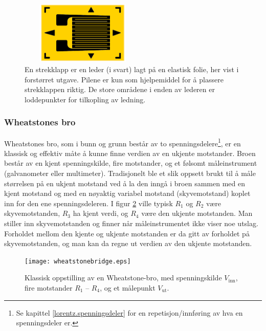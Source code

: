 \documentclass[../Elmag-labhefte-2020.tex]{subfiles}
\begin{document}
\begin{figure}[h!b]
    \centering
    \includegraphics[width=6.01cm,height=3cm,keepaspectratio]{fig/strekklapp.png}
    \caption{%
        En strekklapp er en leder (i svart) lagt på en elastisk folie, her vist i forstørret utgave. Pilene er kun som hjelpemiddel for å plassere strekklappen riktig. De store områdene i enden av lederen er loddepunkter for tilkopling av ledning.
    }   
    \label{fig:strekklapp}
\end{figure}


\subsubsection{Wheatstones bro}\vspace{-5mm}
Wheatstones bro, som i bunn og grunn består av to spenningsdelere\footnote{Se kapittel \ref{lorentz.spenningsdeler} for en repetisjon/innføring av hva en spenningsdeler er.}, er en klassisk og effektiv måte å kunne finne verdien av en ukjente motstander. Broen består av en kjent spenningskilde, fire motstander, og et følsomt måleinstrument (galvanometer eller multimeter). Tradisjonelt ble et slik oppsett brukt til å måle størrelsen på en ukjent motstand ved å la den inngå i broen sammen med en kjent motstand og med en nøyaktig variabel motstand (skyvemotstand) koplet inn for den ene spenningsdeleren. 
I figur \ref{fig:wheatstonebridge} ville typisk $R_1$ og $R_2$ være skyvemotstanden, $R_3$ ha kjent verdi, og $R_4$ være den ukjente motstanden. Man stiller inn skyvemotstanden og finner når måleinstrumentet ikke viser noe utslag.  Forholdet mellom den kjente og ukjente motstanden er da gitt av forholdet på skyvemotstanden, og man kan da regne ut verdien av den ukjente motstanden. 


\begin{figure}[htbp]
    \centering
    \texttt{[image: wheatstonebridge.eps]}
    \caption{%
        Klassisk oppstilling av en Wheatstone-bro, med spenningskilde $V_\text{inn}$, fire motstander $R_1$ -- $R_4$, og et målepunkt $V_\text{ut}$.
    }
    \label{fig:wheatstonebridge}
\end{figure}
\end{document}
